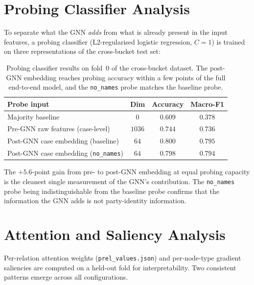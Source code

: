 \section{Probing Classifier Analysis}

To separate what the GNN \emph{adds} from what is already present in
the input features, a probing classifier (L2-regularised logistic
regression, $C\!=\!1$) is trained on three representations of the
cross-bucket test set:

\begin{table}[H]
  \centering
  \small
  \begin{tabular}{lccc}
    \toprule
    Probe input & Dim & Accuracy & Macro-F1 \\
    \midrule
    Majority baseline & $0$ & $0.609$ & $0.378$ \\
    Pre-GNN raw features (case-level) & $1036$ & $0.744$ & $0.736$ \\
    Post-GNN case embedding (baseline) & $64$ & $0.800$ & $0.795$ \\
    Post-GNN case embedding (\texttt{no\_names}) & $64$ & $0.798$ & $0.794$ \\
    \bottomrule
  \end{tabular}
  \caption{Probing classifier results on fold~0 of the cross-bucket
  dataset. The post-GNN embedding reaches probing accuracy within a
  few points of the full end-to-end model, and the \texttt{no\_names}
  probe matches the baseline probe.}
  \label{tab:probing}
\end{table}

The $+5.6$-point gain from pre- to post-GNN embedding at equal probing
capacity is the cleanest single measurement of the GNN's contribution.
The \texttt{no\_names} probe being indistinguishable from the baseline
probe confirms that the information the GNN adds is not party-identity
information.

\section{Attention and Saliency Analysis}

Per-relation attention weights (\texttt{prel\_values.json}) and
per-node-type gradient saliencies are computed on a held-out fold for
interpretability. Two consistent patterns emerge across all
configurations.

